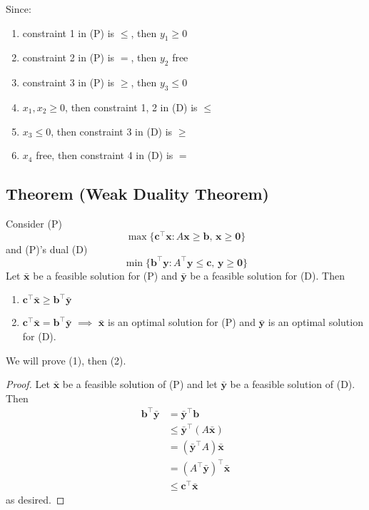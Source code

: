 Since:
\begin{enumerate}
    \item constraint 1 in (P) is $\le$, then $y_1 \ge 0$
    \item constraint 2 in (P) is $=$, then $y_2$ free
    \item constraint 3 in (P) is $\ge$, then $y_3 \le 0$
    \item $x_1,x_2\ge 0$, then constraint 1, 2 in (D) is $\le$
    \item $x_3\le 0$, then constraint 3 in (D) is $\ge$
    \item $x_4$ free, then constraint 4 in (D) is $=$
\end{enumerate}


\begin{thmbox}
    \subsection{Theorem (Weak Duality Theorem)}
    Consider (P)
    \[ \max \{\bm{c}^{\top} \bm{x}: A \bm{x} \geq \bm{b},\, \bm{x} \geq \bm{0}\} \]
    and (P)'s dual (D)
    \[ \min \{\bm{b}^{\top} \bm{y}: A^{\top} \bm{y} \leq \bm{c},\, \bm{y} \geq \bm{0}\}\]
    Let $ \bm{\bar{x}} $ be a feasible solution for (P) and $ \bm{\bar{y}} $
    be a feasible solution for (D). Then
    \begin{enumerate}[(1)]
        \item $ \bm{c}^\top \bm{\bar{x}}\ge \bm{b}^\top \bm{\bar{y}} $
        \item $ \bm{c}^\top \bm{\bar{x}}=\bm{b}^\top \bm{\bar{y}} $ $ \implies $
        $ \bm{\bar{x}} $ is an optimal solution for (P) and $ \bm{\bar{y}} $ is an optimal solution for (D).
    \end{enumerate}
\end{thmbox}
We will prove (1), then (2).
\begin{proof}
    Let $ \bm{\bar{x}} $ be a feasible solution of (P) and let $ \bm{\bar{y}} $
    be a feasible solution of (D). Then
    \begin{align*}
        \bm{b}^\top \bm{\bar{y}}&=\bm{\bar{y}}^\top \bm{b}\\
        &\le \bm{\bar{y}}^\top(A \bm{\bar{x}})\\
        &=(\bm{\bar{y}}^\top A) \bm{\bar{x}}\\
        &=(A ^\top \bm{\bar{y}})^\top \bm{\bar{x}}\\
        &\le \bm{c}^\top \bm{\bar{x}} 
    \end{align*}
    as desired.
\end{proof}

